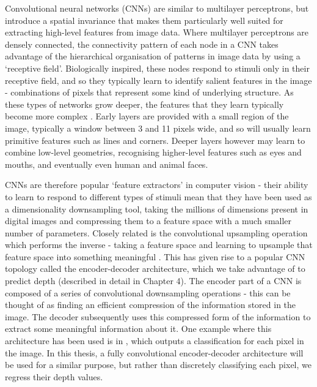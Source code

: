 Convolutional neural networks (CNNs) are similar to multilayer perceptrons, but introduce a spatial invariance that makes them particularly well suited for extracting high-level features from image data. Where multilayer perceptrons are densely connected, the connectivity pattern of each node in a CNN takes advantage of the hierarchical organisation of patterns in image data by using a `receptive field'. Biologically inspired, these nodes respond to stimuli only in their receptive field, and so they typically learn to identify salient features in the image - combinations of pixels that represent some kind of underlying structure. As these types of networks grow deeper, the features that they learn typically become more complex \cite{lecun1989cnn}. Early layers are provided with a small region of the image, typically a window between 3 and 11 pixels wide, and so will usually learn primitive features such as lines and corners. Deeper layers however may learn to combine low-level geometries, recognising higher-level features such as eyes and mouths, and eventually even human and animal faces.


CNNs are therefore popular `feature extractors' in computer vision - their ability to learn to respond to different types of stimuli mean that they have been used as a dimensionality downsampling tool, taking the millions of dimensions present in digital images  and compressing them to a feature space with a much smaller number of parameters. Closely related is the convolutional upsampling operation which performs the inverse - taking a feature space and learning to upsample that feature space into something meaningful \cite{long2014fcn}. This has given rise to a popular CNN topology called the encoder-decoder architecture, which we take advantage of to predict depth (described in detail in Chapter 4). The encoder part of a CNN is composed of a series of convolutional downsampling operations - this can be thought of as finding an efficient compression of the information stored in the image. The decoder subsequently uses this compressed form of the information to extract some meaningful information about it. One example where this architecture has been used is in \cite{long2014fcn}, which outputs a classification for each pixel in the image. In this thesis, a fully convolutional encoder-decoder architecture will be used for a similar purpose, but rather than discretely classifying each pixel, we regress their depth values. 



